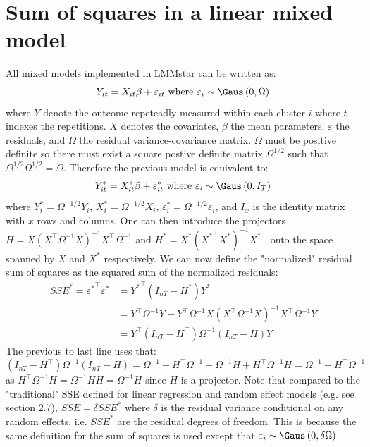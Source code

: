 \documentclass[12pt]{article}
\newcommand\trans[1]{{#1}^\intercal}%
\begin{document}
\section{Sum of squares in a linear mixed model}
\label{SM:sumSquares}
All mixed models implemented in LMMstar can be written as:
\[ Y_{it} = X_{it}\beta + \varepsilon_{it} \text{ where } \varepsilon_{i} \sim \Gaus\left(0,\Omega\right)\]
where \(Y\) denote the outcome repeteadly measured within each cluster
\(i\) where \(t\) indexes the repetitions. \(X\) denotes the
covariates, \(\beta\) the mean parameters, \(\varepsilon\) the
residuals, and \(\Omega\) the residual variance-covariance matrix.
\(\Omega\) must be positive definite so there must exist a square
postive definite matrix \(\Omega^{1/2}\) such that
\(\Omega^{1/2}\Omega^{1/2} = \Omega\). Therefore the previous model is
equivalent to:
\[ Y^*_{it} = X^*_{it}\beta + \varepsilon^*_{it} \text{ where } \varepsilon_{i} \sim \Gaus\left(0,I_T\right)\]
where \(Y^*_{i} = \Omega^{-1/2} Y_{i}\), \(X^*_{i} = \Omega^{-1/2}
X_{i}\), \(\varepsilon^*_{i} = \Omega^{-1/2} \varepsilon_{i}\), and
\(I_x\) is the identity matrix with \(x\) rows and columns. One can
then introduce the projectors \(H= X \left(\trans{X}\Omega^{-1}
X\right)^{-1}\trans{X} \Omega^{-1}\) and \(H^*= X^*
\left(\trans{X^*}X^*\right)^{-1}\trans{X^*}\) onto the space spanned
by \(X\) and \(X^*\) respectively. We can now define the "normalized"
residual sum of squares as the squared sum of the normalized
residuals:
\begin{align*}
SSE^* = \trans{\varepsilon^*} \varepsilon^* &= \trans{Y^*} (I_{nT}-H^*) Y^* \\
&= \trans{Y} \Omega^{-1} Y - \trans{Y} \Omega^{-1} X \left(\trans{X}\Omega^{-1} X\right)^{-1} \trans{X} \Omega^{-1} Y \\
&= \trans{Y} (I_{nT}-\trans{H}) \Omega^{-1} (I_{nT}-H) Y 
\end{align*}
The previous to last line uses that: \((I_{nT}-\trans{H}) \Omega^{-1}
(I_{nT}-H)= \Omega^{-1} - \trans{H} \Omega^{-1} - \Omega^{-1}H +
\trans{H} \Omega^{-1} H = \Omega^{-1} - \trans{H}\Omega^{-1}\) as
\(\trans{H} \Omega^{-1} H = \Omega^{-1}HH=\Omega^{-1}H\) since \(H\)
is a projector. Note that compared to the "traditional" SSE defined
for linear regression and random effect models (e.g. see
\cite{christensen2002plane} section 2.7), \(SSE=\delta SSE^{*}\) where
\(\delta\) is the residual variance conditional on any random effects,
i.e. \(SSE^{*}\) are the residual degrees of freedom. This is because
the same definition for the sum of squares is used except that
\(\varepsilon_{i} \sim \Gaus\left(0,\delta\Omega\right)\).
\end{document}
